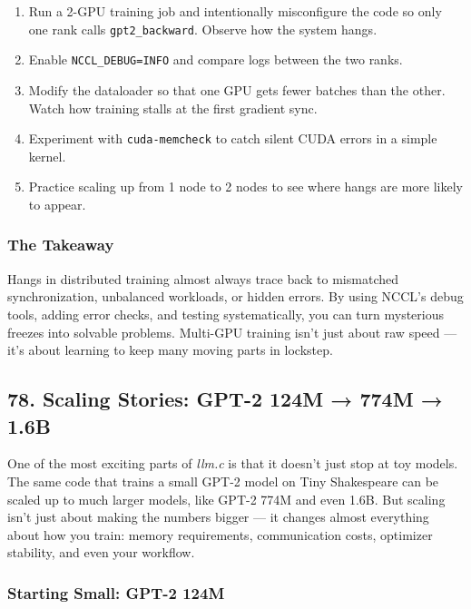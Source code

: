 \documentclass[
  letterpaper,
  DIV=11,
  numbers=noendperiod]{scrreprt}
\providecommand{\tightlist}{%
  \setlength{\itemsep}{0pt}\setlength{\parskip}{0pt}}
\begin{document}
\begin{enumerate}
\def\labelenumi{\arabic{enumi}.}
\tightlist
\item
  Run a 2-GPU training job and intentionally misconfigure the code so
  only one rank calls \texttt{gpt2\_backward}. Observe how the system
  hangs.
\item
  Enable \texttt{NCCL\_DEBUG=INFO} and compare logs between the two
  ranks.
\item
  Modify the dataloader so that one GPU gets fewer batches than the
  other. Watch how training stalls at the first gradient sync.
\item
  Experiment with \texttt{cuda-memcheck} to catch silent CUDA errors in
  a simple kernel.
\item
  Practice scaling up from 1 node to 2 nodes to see where hangs are more
  likely to appear.
\end{enumerate}

\subsubsection{The Takeaway}\label{the-takeaway-66}

Hangs in distributed training almost always trace back to mismatched
synchronization, unbalanced workloads, or hidden errors. By using NCCL's
debug tools, adding error checks, and testing systematically, you can
turn mysterious freezes into solvable problems. Multi-GPU training isn't
just about raw speed --- it's about learning to keep many moving parts
in lockstep.

\subsection{78. Scaling Stories: GPT-2 124M → 774M →
1.6B}\label{scaling-stories-gpt-2-124m-774m-1.6b}

One of the most exciting parts of \emph{llm.c} is that it doesn't just
stop at toy models. The same code that trains a small GPT-2 model on
Tiny Shakespeare can be scaled up to much larger models, like GPT-2 774M
and even 1.6B. But scaling isn't just about making the numbers bigger
--- it changes almost everything about how you train: memory
requirements, communication costs, optimizer stability, and even your
workflow.

\subsubsection{Starting Small: GPT-2
124M}\label{starting-small-gpt-2-124m}
\end{document}
